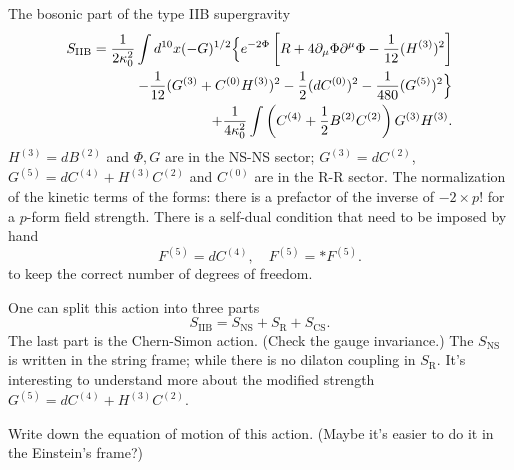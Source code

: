 \begin{correct}
The bosonic part of the type IIB supergravity 
\begin{align}
	S_{\text{IIB}} = \frac{1}{2\kappa_0^2}
	\int d^{10} x (-G)^{1 / 2} \Big\{
		e^{-2\Phi} \left[ R + 4 \partial_\mu\Phi \partial^\mu\Phi
		-\frac{1}{12}(H^{(3)})^2\right] \notag \\
		- \frac{1}{12} (G^{(3)} + C^{(0)} H^{(3)})^2
		- \frac{1}{2} (d C^{(0)})^2
	-\frac{1}{480} (G^{(5)})^2 \Big\} \notag\\
	+ \frac{1}{4\kappa_0^2} \int
	\left( C^{(4)} + \frac{1}{2} B^{(2)} C^{(2)} \right) G^{(3)} H^{(3)}. 
\end{align}
$H^{(3)}=dB^{(2)}$ and $\Phi,G$ are in the NS-NS sector;
$G^{(3)} = dC^{(2)}$, $G^{(5)}=dC^{(4)}+H^{(3)}C^{(2)}$ and $C^{(0)}$
are in the R-R sector.
The normalization of the kinetic terms of the forms:
there is a prefactor of the inverse of $-2\times p!$ for a $p$-form field strength.
There is a self-dual condition that need to be imposed by hand
\[
	F^{(5)} = dC^{(4)},\quad F^{(5)}=*F^{(5)}
.\] 
to keep the correct number of degrees of freedom.
\end{correct}

One can split this action into three parts
\[
	S_{\text{IIB}} = S_{\text{NS}} + S_{\text{R}} + S_{\text{CS}}
.\] 
The last part is the Chern-Simon action.
(Check the gauge invariance.)
The $S_{\text{NS}}$ is written in the string frame;
while there is no dilaton coupling in $S_{\text{R}}$.
It's interesting to understand more about the modified strength
$G^{(5)} = dC^{(4)} + H^{(3)}C^{(2)}$.

\begin{todo}
Write down the equation of motion of this action.	
(Maybe it's easier to do it in the Einstein's frame?)
\end{todo}

